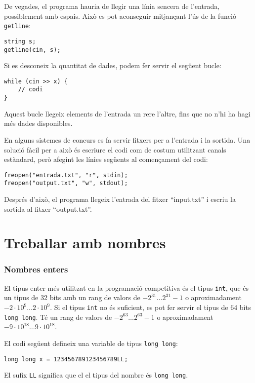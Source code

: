 De vegades, el programa hauria de llegir una línia sencera
de l'entrada, possiblement amb espais.
Això es pot aconseguir mitjançant l'ús de
la funció \texttt{getline}:

\begin{lstlisting}
string s;
getline(cin, s);
\end{lstlisting}

Si es desconeix la quantitat de dades, podem fer servir el
següent bucle:
\begin{lstlisting}
while (cin >> x) {
    // codi
}
\end{lstlisting}
Aquest bucle llegeix elements de l'entrada
un rere l'altre, fins que no n'hi ha
hagi més dades disponibles.

En alguns sistemes de concurs es fa servir fitxers per
a l'entrada i la sortida.
Una solució fàcil per a això és escriure
el codi com de costum utilitzant canals estàndard,
però afegint les línies següents al començament del codi:
\begin{lstlisting}
freopen("entrada.txt", "r", stdin);
freopen("output.txt", "w", stdout);
\end{lstlisting}
Després d'això, el programa llegeix l'entrada del fitxer
``input.txt'' i escriu la sortida al fitxer
``output.txt''.

\section{Treballar amb nombres}


\subsubsection{Nombres enters}

El tipus enter més utilitzat en la programació competitiva
és el tipus \texttt{int}, que és un tipus de 32 bits amb
un rang de valors de $-2^{31} \ldots 2^{31}-1$
o aproximadament $-2 \cdot 10^9 \ldots 2 \cdot 10^9$.
Si el tipus \texttt{int} no és suficient,
es pot fer servir el tipus de 64 bits \texttt{long long}.
Té un rang de valors de $-2^{63} \ldots 2^{63}-1$
o aproximadament $-9 \cdot 10^{18} \ldots 9 \cdot 10^{18}$.

El codi següent defineix una
variable de tipus \texttt{long long}:
\begin{lstlisting}
long long x = 123456789123456789LL;
\end{lstlisting}
El sufix \texttt{LL} significa que el
el tipus del nombre és \texttt{long long}.


